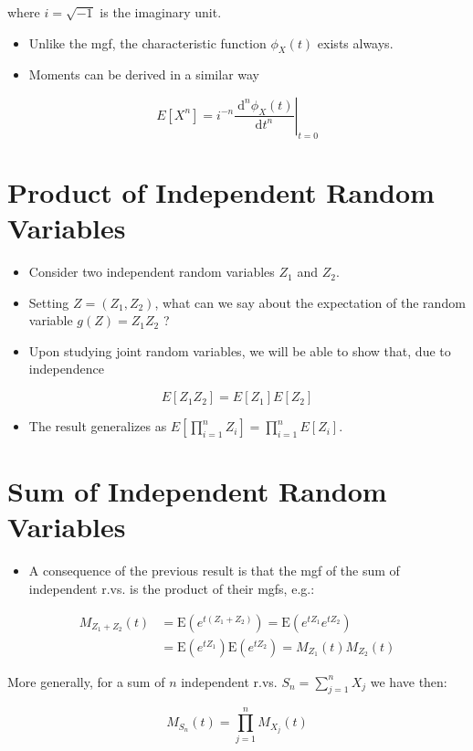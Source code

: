 \documentclass[10pt]{article}
\begin{document}
where $i=\sqrt{-1}$ is the imaginary unit.

\begin{itemize}
  \item Unlike the mgf, the characteristic function $\phi_{X}(t)$ exists always.
  \item Moments can be derived in a similar way
\end{itemize}

$$
E\left[X^{n}\right]=\left.i^{-n} \frac{\mathrm{~d}^{n} \phi_{X}(t)}{\mathrm{d} t^{n}}\right|_{t=0}
$$

\section*{Product of Independent Random Variables}
\begin{itemize}
  \item Consider two independent random variables $Z_{1}$ and $Z_{2}$.
  \item Setting $Z=\left(Z_{1}, Z_{2}\right)$, what can we say about the expectation of the random variable $g(Z)=Z_{1} Z_{2}$ ?
  \item Upon studying joint random variables, we will be able to show that, due to independence
\end{itemize}

$$
E\left[Z_{1} Z_{2}\right]=E\left[Z_{1}\right] E\left[Z_{2}\right]
$$

\begin{itemize}
  \item The result generalizes as $E\left[\prod_{i=1}^{n} Z_{i}\right]=\prod_{i=1}^{n} E\left[Z_{i}\right]$.
\end{itemize}

\section*{Sum of Independent Random Variables}
\begin{itemize}
  \item A consequence of the previous result is that the mgf of the sum of independent r.vs. is the product of their mgfs, e.g.:
\end{itemize}

$$
\begin{aligned}
M_{Z_{1}+Z_{2}}(t) & =\mathrm{E}\left(e^{t\left(Z_{1}+Z_{2}\right)}\right)=\mathrm{E}\left(e^{t Z_{1}} e^{t Z_{2}}\right) \\
& =\mathrm{E}\left(e^{t Z_{1}}\right) \mathrm{E}\left(e^{t Z_{2}}\right)=M_{Z_{1}}(t) M_{Z_{2}}(t)
\end{aligned}
$$

More generally, for a sum of $n$ independent r.vs. $S_{n}=\sum_{j=1}^{n} X_{j}$ we have then:

$$
M_{S_{n}}(t)=\prod_{j=1}^{n} M_{X_{j}}(t)
$$
\end{document}
